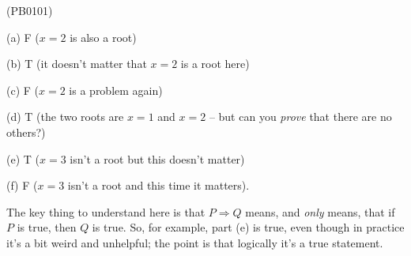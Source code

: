 (PB0101)

(a) F ($x=2$ is also a root)

(b) T (it doesn't matter that $x=2$ is a root here)

(c) F ($x=2$ is a problem again)

(d) T (the two roots are $x=1$ and $x=2$ -- but can you \emph{prove} that there are no others?)

(e) T ($x=3$ isn't a root but this doesn't matter)

(f) F ($x=3$ isn't a root and this time it matters).

The key thing to understand here is that $P \Rightarrow Q$ means, and \emph{only} means, that if $P$ is true, then $Q$ is true. So, for example, part (e) is true, even though in practice it's a bit weird and unhelpful; the point is that logically it's a true statement.
